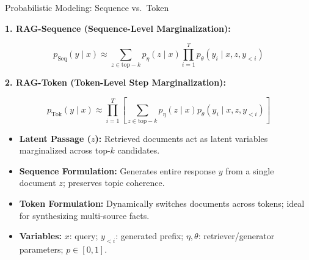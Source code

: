 \begin{frame}{Probabilistic Modeling: Sequence vs.\ Token}
  \vspace{-0.1cm}
  {\footnotesize\textbf{1. RAG-Sequence (Sequence-Level Marginalization):}\par}
  \vspace{-4pt}
  \[
    p_{\mathrm{Seq}}(y \mid x) \approx \sum_{z \in \mathrm{top-}k} p_\eta(z \mid x) \prod_{i=1}^{T} p_\theta(y_i \mid x, z, y_{<i})
  \]
  \vspace{-4pt}
  {\footnotesize\textbf{2. RAG-Token (Token-Level Step Marginalization):}\par}
  \vspace{-4pt}
  \[
    p_{\mathrm{Tok}}(y \mid x) \approx \prod_{i=1}^{T} \left[ \sum_{z \in \mathrm{top-}k} p_\eta(z \mid x) p_\theta(y_i \mid x, z, y_{<i}) \right]
  \]

  \begin{itemize}
    \setlength{\itemsep}{0.12cm}
    \item \textbf{Latent Passage ($z$):} Retrieved documents act as latent variables marginalized across top-$k$ candidates.
    \item \textbf{Sequence Formulation:} Generates entire response $y$ from a single document $z$; preserves topic coherence.
    \item \textbf{Token Formulation:} Dynamically switches documents across tokens; ideal for synthesizing multi-source facts.
    \item \textbf{Variables:} $x$: query; $y_{<i}$: generated prefix; $\eta, \theta$: retriever/generator parameters; $p \in [0, 1]$.
  \end{itemize}

\end{frame}
